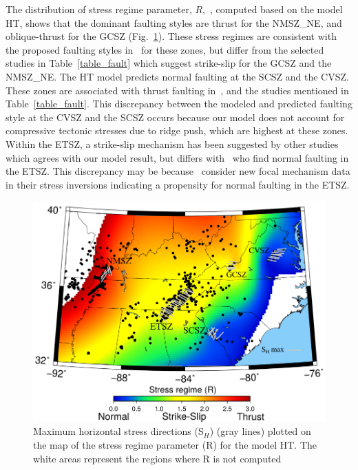 \documentclass[draft,linenumbers]{agujournal2018}
\begin{document}
The distribution of stress regime parameter, $R$,~\citep{delvaux1997paleostress,simpson1997quantifying}, computed based on the model HT, shows that the dominant faulting styles are thrust for the NMSZ\_NE, and oblique-thrust for the GCSZ (Fig.~\ref{sigma1}). These stress regimes are consistent with the proposed faulting styles in~\citet{levandowski2018updated} for these zones, but differ from the selected studies in Table~\ref{table_fault} which suggest strike-slip for the GCSZ and the NMSZ\_NE.  
The HT model predicts normal faulting at the SCSZ and the CVSZ. These zones are associated with thrust faulting in~\citet{levandowski2018updated}, and the studies mentioned in Table~\ref{table_fault}. This discrepancy between the modeled and predicted faulting style at the CVSZ and the SCSZ occurs because our model does not account for compressive tectonic stresses due to ridge push, which are highest at these zones. Within the ETSZ, a strike-slip mechanism has been suggested by other studies~\citep[][]{chapman1997statistical, mazzotti2010state, powell2016grenville} which agrees with our model result, but differs with~\citet{cooley2015new, levandowski2018updated} who find normal faulting in the ETSZ.  This discrepancy may be because~\citet{cooley2015new, levandowski2018updated} consider new focal mechanism data in their stress inversions indicating a propensity for normal faulting in the ETSZ.

\begin{figure}[h!]
    \centering
    \includegraphics[width=0.75\linewidth]{figures/sigma1.png}
    \caption{Maximum horizontal stress directions (S$_H$) (gray lines) plotted on the map of the stress regime parameter (R) for the model HT. The white areas represent the regions where R is not computed}
    \label{sigma1}
\end{figure}
\end{document}

